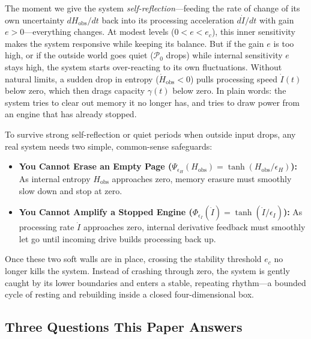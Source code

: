 \documentclass[11pt,a4paper]{article}
\theoremstyle{definition}
\begin{document}
The moment we give the system \emph{self-reflection}---feeding the rate of change of its own uncertainty $dH_{\mathrm{obs}}/dt$ back into its processing acceleration $d\dot{I}/dt$ with gain $e > 0$---everything changes. At modest levels ($0 < e < e_c$), this inner sensitivity makes the system responsive while keeping its balance. But if the gain $e$ is too high, or if the outside world goes quiet ($\mathcal{P}_0$ drops) while internal sensitivity $e$ stays high, the system starts over-reacting to its own fluctuations. Without natural limits, a sudden drop in entropy ($\dot{H}_{\mathrm{obs}} < 0$) pulls processing speed $\dot{I}(t)$ below zero, which then drags capacity $\gamma(t)$ below zero. In plain words: the system tries to clear out memory it no longer has, and tries to draw power from an engine that has already stopped.

To survive strong self-reflection or quiet periods when outside input drops, any real system needs two simple, common-sense safeguards:
\begin{itemize}
  \item \textbf{You Cannot Erase an Empty Page ($\Psi_{\epsilon_H}(H_{\mathrm{obs}}) = \tanh(H_{\mathrm{obs}}/\epsilon_H)$):} As internal entropy $H_{\mathrm{obs}}$ approaches zero, memory erasure must smoothly slow down and stop at zero.
  \item \textbf{You Cannot Amplify a Stopped Engine ($\Phi_{\epsilon_I}(\dot{I}) = \tanh(\dot{I}/\epsilon_I)$):} As processing rate $\dot{I}$ approaches zero, internal derivative feedback must smoothly let go until incoming drive builds processing back up.
\end{itemize}

Once these two soft walls are in place, crossing the stability threshold $e_c$ no longer kills the system. Instead of crashing through zero, the system is gently caught by its lower boundaries and enters a stable, repeating rhythm---a bounded cycle of resting and rebuilding inside a closed four-dimensional box.

\subsection{Three Questions This Paper Answers}
\end{document}
